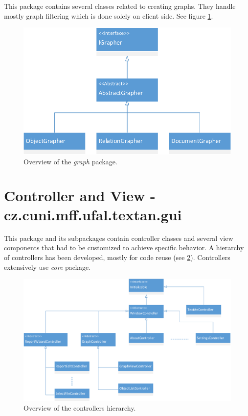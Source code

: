 This package contains several classes related to creating graphs. They handle
mostly graph filtering which is done solely on client side. See figure
\ref{fig:Graph}.

\begin{figure}[!htb]
        \centering
        \includegraphics[width=\textwidth]{Images/Graph}
        \caption{Overview of the \emph{graph} package.}
        \label{fig:Graph}
\end{figure}

\section{Controller and View - cz.cuni.mff.ufal.textan.gui}

This package and its subpackages contain controller classes and several view
components that had to be customized to achieve specific behavior. A hierarchy
of controllers has been developed, mostly for code reuse (see
\ref{fig:Controllers}). Controllers extensively use \emph{core} package.

\begin{figure}[!htb]
        \centering
        \includegraphics[width=\textwidth]{Images/Controllers}
        \caption{Overview of the controllers hierarchy.}
        \label{fig:Controllers}
\end{figure}

